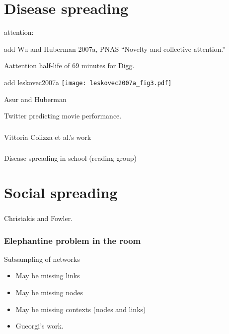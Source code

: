 \section{Disease spreading}

attention:

add Wu and Huberman 2007a, PNAS
``Novelty and collective attention.''

Aattention half-life of 69 minutes for Digg.

add leskovec2007a
\texttt{[image: leskovec2007a\_fig3.pdf]}

Asur and Huberman

Twitter predicting movie performance.

\begin{frame}
  \frametitle{}

  Vittoria Colizza et al.'s work

\end{frame}


\begin{frame}
  \frametitle{}

  Disease spreading in school (reading group)

\end{frame}



\section{Social spreading}

\begin{frame}
  \frametitle{}

  Christakis and Fowler.

\end{frame}

\begin{frame}
  \frametitle{Elephantine problem in the room}

  \begin{block}{Subsampling of networks}
    \begin{itemize}
    \item 
      May be missing links
    \item 
      May be missing nodes
    \item 
      May be missing contexts (nodes and links)
    \item 
      Gueorgi's work.
    \end{itemize}
  \end{block}


\end{frame}


